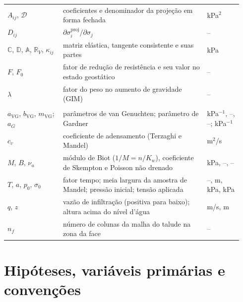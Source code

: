 \documentclass[11pt,a4paper]{article}
\numberwithin{equation}{section}
\begin{document}
{\begin{longtable}{@{}>{\raggedright\arraybackslash}p{0.22\linewidth}>{\raggedright\arraybackslash}p{0.58\linewidth}>{\raggedright\arraybackslash}p{0.14\linewidth}@{}}
$A_{ij}$, $\mathcal D$ & coeficientes e denominador da projeção em forma fechada & kPa$^2$\\
$D_{ij}$ & $\partial\sigma_i^{\mathrm{proj}}/\partial\sigma_j$ & --\\
$\mathbb C$, $\mathbb D$, $\mathbb A$, $\mathbb R_V$, $\kappa_{ij}$ & matriz elástica, tangente consistente e suas partes & kPa\\
$F$, $F_0$ & fator de redução de resistência e seu valor no estado geostático & --\\
$\lambda$ & fator do peso no aumento de gravidade (GIM) & --\\
\multicolumn{3}{@{}l}{\emph{Leis hidráulicas e verificação}}\\
$a_{\mathrm{VG}}$, $b_{\mathrm{VG}}$, $m_{\mathrm{VG}}$; $a_G$ & parâmetros de van Genuchten; parâmetro de Gardner &
kPa$^{-1}$, --, --; kPa$^{-1}$\\
$c_v$ & coeficiente de adensamento (Terzaghi e Mandel) & m$^2$/s\\
$M$, $B$, $\nu_u$ & módulo de Biot ($1/M=n/K_w$), coeficiente de Skempton e Poisson não drenado & kPa, --, --\\
$T$, $a$, $p_0$, $\sigma_0$ & fator tempo; meia largura da amostra de Mandel; pressão inicial; tensão aplicada & --, m, kPa, kPa\\
$q$, $z$ & vazão de infiltração (positiva para baixo); altura acima do nível d'água & m/s, m\\
$n_f$ & número de colunas da malha do talude na zona da face & --\\
\bottomrule
\end{longtable}
}

\section{Hipóteses, variáveis primárias e convenções}\label{sec:hip}
\end{document}
